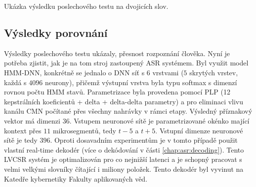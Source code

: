 \begin{table}[htpb]
  \centering
  \def\arraystretch{1.5}
  \caption{Ukázka výsledku poslechového testu na dvojicích slov.}
  \label{tab:realisation:listening:bigrams}
\end{table}

\subsection{Výsledky porovnání}
\label{chap:realisation:comparison}

Výsledky poslechového testu ukázaly, přesnost rozpoznání člověka.
Nyní je potřeba zjistit, jak je na tom stroj zastoupený ASR systémem.
Byl využit model HMM-DNN, konkrétně se jednalo o DNN síť s $6$ vrstvami ($5$ skrytých vrstev, každá s $4096$ neurony), přičemž výstupní vrstva byla typu softmax s dimenzí rovnou počtu HMM stavů.
Parametrizace byla provedena pomocí PLP (12 kepstrálních koeficientů + delta + delta-delta parametry) a pro eliminaci vlivu kanálu CMN počítané přes všechny nahrávky v rámci etapy.
Výsledný příznakový vektor má dimenzi $36$.
Vstupem neuronové sítě je parametrizované okénko mající kontext přes $11$ mikrosegmentů, tedy $t-5$ a $t+5$.
Vstupní dimenze neuronové sítě je tedy $396$.
Oproti dosavadním experimentům je v tomto případě použit vlastní real-time dekodér (více o dekódování v části \ref{chap:asr:decoding}).
Tento LVCSR systém je optimalizován pro co nejnižší latenci a je schopný pracovat s velmi velkými slovníky čítající i miliony položek.
Tento dekodér byl vyvinut na Katedře kybernetiky Fakulty aplikovaných věd.

